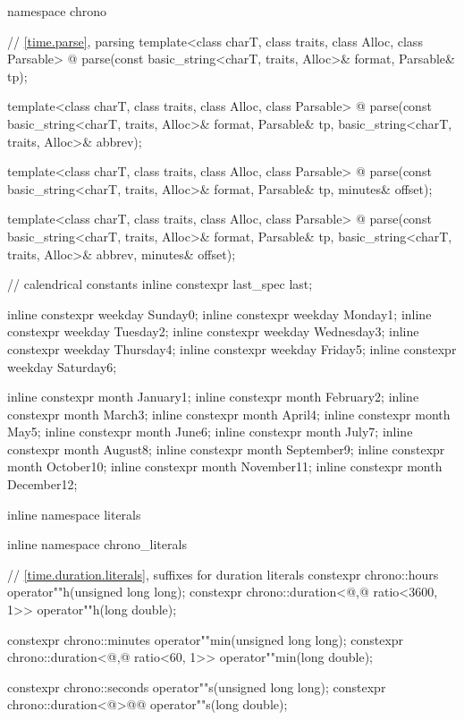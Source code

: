 \begin{codeblock}
{  namespace chrono {
    // \ref{time.parse}, parsing
    template<class charT, class traits, class Alloc, class Parsable>
      @\unspec@
        parse(const basic_string<charT, traits, Alloc>& format, Parsable& tp);

    template<class charT, class traits, class Alloc, class Parsable>
      @\unspec@
        parse(const basic_string<charT, traits, Alloc>& format, Parsable& tp,
              basic_string<charT, traits, Alloc>& abbrev);

    template<class charT, class traits, class Alloc, class Parsable>
      @\unspec@
        parse(const basic_string<charT, traits, Alloc>& format, Parsable& tp,
              minutes& offset);

    template<class charT, class traits, class Alloc, class Parsable>
      @\unspec@
        parse(const basic_string<charT, traits, Alloc>& format, Parsable& tp,
              basic_string<charT, traits, Alloc>& abbrev, minutes& offset);

    // calendrical constants
    inline constexpr last_spec last{};

    inline constexpr weekday Sunday{0};
    inline constexpr weekday Monday{1};
    inline constexpr weekday Tuesday{2};
    inline constexpr weekday Wednesday{3};
    inline constexpr weekday Thursday{4};
    inline constexpr weekday Friday{5};
    inline constexpr weekday Saturday{6};

    inline constexpr month January{1};
    inline constexpr month February{2};
    inline constexpr month March{3};
    inline constexpr month April{4};
    inline constexpr month May{5};
    inline constexpr month June{6};
    inline constexpr month July{7};
    inline constexpr month August{8};
    inline constexpr month September{9};
    inline constexpr month October{10};
    inline constexpr month November{11};
    inline constexpr month December{12};
  }

  inline namespace literals {
  inline namespace chrono_literals {
    // \ref{time.duration.literals}, suffixes for duration literals
    constexpr chrono::hours                                 operator""h(unsigned long long);
    constexpr chrono::duration<@\unspec,@ ratio<3600, 1>> operator""h(long double);

    constexpr chrono::minutes                             operator""min(unsigned long long);
    constexpr chrono::duration<@\unspec,@ ratio<60, 1>> operator""min(long double);

    constexpr chrono::seconds               operator""s(unsigned long long);
    constexpr chrono::duration<@\unspec@>@\itcorr[-1]@ operator""s(long double);

}}}
\end{codeblock}
